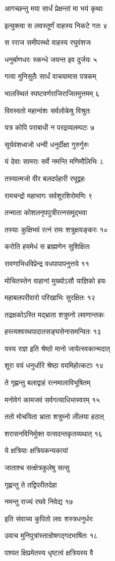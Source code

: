 आगच्छन्तु मया सार्धं प्रेक्षन्तां मा भयं कृथाः

इत्युक्त्वा स लवस्तूर्णं वाहस्य निकटे गतः ४

स रराज समीपस्थो वाहस्य रघुवंशजः

धनुर्बाणधरः स्कन्धे जयन्त इव दुर्जयः ५

गत्वा मुनिसुतैः सार्धं वाचयामास पत्रकम्

भालस्थितं स्पष्टवर्णराजिराजितमुत्तमम् ६

विवस्वतो महान्वंशः सर्वलोकेषु विश्रुतः

यत्र कोपि पराबाधी न परद्रव्यलम्पटः ७

सूर्यवंशध्वजो धन्वी धनुर्दीक्षा गुरुर्गुरुः

यं देवाः सामराः सर्वे नमन्ति मणिमौलिभिः ८

तस्यात्मजो वीर बलदर्पहारी रघूद्वहः

रामचन्द्रो महाभागः सर्वशूरशिरोमणिः ९

तन्माता कोशलनृपपुत्रीरत्नसमुद्भवा

तस्याः कुक्षिभवं रत्नं रामः शत्रुक्षयङ्करः १०

करोति हयमेधं स ब्राह्मणेन सुशिक्षितः

रावणाभिधविप्रेन्द्र वधपापापनुत्तये ११

मोचितस्तेन वाहानां मुख्योऽसौ याज्ञिको हयः

महाबलपरीवारो परिखाभिः सुरक्षितः १२

तद्रक्षकोऽस्ति मद्भ्राता शत्रुघ्नो लवणान्तकः

हस्त्यश्वरथपादातसङ्घसेनासमन्वितः १३

यस्य राज्ञ इति श्रेष्ठो मानो जायेत्स्वकान्मदात्

शूरा वयं धनुर्धारि श्रेष्ठा वयमिहोत्कटाः १४

ते गृह्णन्तु बलाद्वाहं रत्नमालाविभूषितम्

मनोवेगं कामजवं सर्वगत्याधिभास्वरम् १५

ततो मोचयिता भ्राता शत्रुघ्नो लीलया हठात्

शरासनविनिर्मुक्त वत्सदन्तकृतव्यथात् १६

ये क्षत्रियाः क्षत्रियकन्यकायां

जाताश्च सत्क्षेत्रकुलेषु सत्सु

गृह्णन्तु ते तद्विपरीतदेहा

नमन्तु राज्यं रघवे निवेद्य १७

इति संवाच्य कुपितो लवः शस्त्रधनुर्धरः

उवाच मुनिपुत्रांस्तान्रोषगद्गदभाषितः १८

पश्यत क्षिप्रमेतस्य धृष्टत्वं क्षत्रियस्य वै

